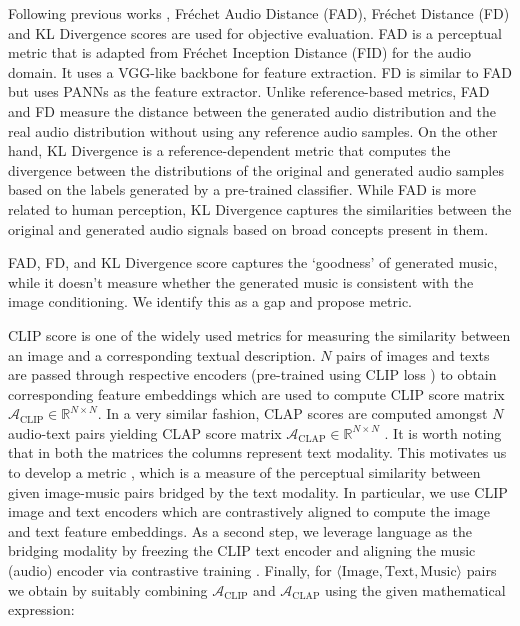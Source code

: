 Following previous works \cite{tango, audioldm, audiogen}, Fréchet Audio Distance
(FAD),  Fréchet Distance (FD) and KL Divergence scores are used for objective evaluation. FAD \cite{audiogen} is a perceptual metric that is adapted from Fréchet Inception Distance
(FID) for the audio domain. It uses a VGG-like backbone \cite{hershey2017cnn} for feature extraction. FD is similar to FAD but uses PANNs \cite{kong2020panns} as the feature extractor.
Unlike reference-based metrics, FAD and FD measure the distance between the
generated audio distribution and the real audio distribution without using any reference audio samples. On the other hand, KL Divergence \cite{audiogen} is a reference-dependent metric that computes the divergence between
the distributions of the original and generated audio samples based on the labels generated by a pre-trained
classifier. While FAD is more related to human perception, KL Divergence captures the similarities
between the original and generated audio signals based on broad concepts present in them. 

FAD, FD, and KL Divergence score captures the `goodness' of generated music, while it doesn't measure whether the generated music is consistent with the image conditioning. We identify this as a gap and propose \imagemusicmetric metric.

\label{cimp_metric}
CLIP score is one of the widely used metrics for measuring the similarity between an image and a corresponding textual description. 
$N$ pairs of images and texts are passed through respective encoders (pre-trained using CLIP loss \cite{clip}) to obtain corresponding feature embeddings which are used to compute CLIP score matrix $\mathcal{A}_{\text{CLIP}} \in \mathbb{R}^{N \times N}$. In a very similar fashion, CLAP scores are computed amongst $N$ audio-text pairs yielding CLAP score matrix $\mathcal{A}_{\text{CLAP}} \in \mathbb{R}^{N \times N}$ \cite{clap}. It is worth noting that in both the matrices the columns represent text modality. This motivates us to develop a metric \imagemusicmetric, which is a measure of the perceptual
similarity between given image-music pairs bridged by the text modality. In particular, we use CLIP image and text encoders which are contrastively aligned \cite{clip} to compute the image and text feature embeddings. As a second step, we leverage language as the bridging modality by freezing the CLIP text encoder and aligning the music (audio) encoder via contrastive training \cite{clap}. Finally, for $\langle \text{Image}, \text{Text}, \text{Music} \rangle$ pairs we obtain \imagemusicmetric by suitably combining $\mathcal{A}_{\text{CLIP}}$ and $\mathcal{A}_{\text{CLAP}}$ using the given mathematical expression:

